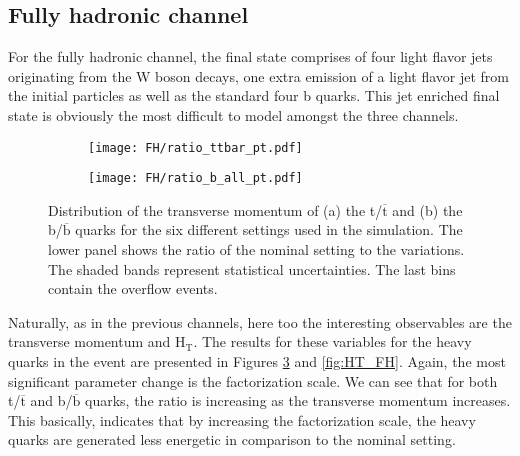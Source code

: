 \subsection{\label{FH}Fully hadronic channel}
\noindent For the fully hadronic channel, the final state comprises of four light flavor jets originating from the W boson decays, one extra emission of a light flavor jet from the initial particles as well as the standard four b quarks. This jet enriched final state is obviously the most difficult to model amongst the three channels.\\
\begin{figure}[H]
    \centering
    \begin{subfigure}{0.49\textwidth}
        \centering
        \texttt{[image: FH/ratio\_ttbar\_pt.pdf]}
        \caption{}
        \label{subfig:pt(t,tbar)_FH}        
    \end{subfigure}
    \hfill
    \begin{subfigure}{0.49\linewidth}
        \centering
        \texttt{[image: FH/ratio\_b\_all\_pt.pdf]}
        \caption{}
        \label{subfig:pt(b_all)_FH}
    \end{subfigure}
    \caption{Distribution of the transverse momentum of (a) the t/$\overline{\text{t}}$ and (b) the b/$\overline{\text{b}}$ quarks for the six different settings used in the simulation. The lower panel shows the ratio of the nominal setting to the variations. The shaded bands represent statistical uncertainties. The last bins contain the overflow events.}
    \label{fig:pt_FH}
\end{figure}
\indent Naturally, as in the previous channels, here too the  interesting observables are the transverse momentum and H$_{\text{T}}$. The results for these variables for the heavy quarks in the event are presented in Figures \ref{fig:pt_FH} and \ref{fig:HT_FH}. Again, the most significant parameter change is the factorization scale. We can see that for both t/$\overline{\text{t}}$ and b/$\overline{\text{b}}$ quarks, the ratio is increasing as the transverse momentum increases. This basically, indicates that by increasing the factorization scale, the heavy quarks are generated less energetic in comparison to the nominal setting.
